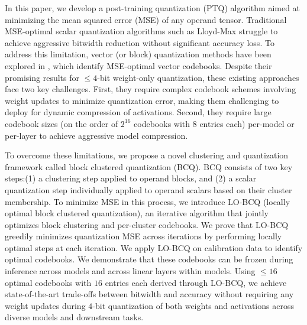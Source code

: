 In this paper, we develop a post-training quantization (PTQ) algorithm aimed at minimizing the mean squared error (MSE) of any operand tensor. Traditional MSE-optimal scalar quantization algorithms such as Lloyd-Max \citep{Lloyd} struggle to achieve aggressive bitwidth reduction without significant accuracy loss. To address this limitation, vector (or block) quantization methods have been explored in \citep{tseng2024quipbetterllmquantization,egiazarian2024aqlm}, which identify MSE-optimal vector codebooks. Despite their promising results for $\le4$-bit weight-only quantization, these existing approaches face two key challenges. First, they require complex codebook schemes involving weight updates to minimize quantization error, making them challenging to deploy for dynamic compression of activations. Second, they require large codebook sizes (on the order of $2^{16}$ codebooks with $8$ entries each) per-model or per-layer to achieve aggressive model compression.



To overcome these limitations, we propose a novel clustering and quantization framework called block clustered quantization (BCQ). BCQ consists of two key steps:(1) a clustering step applied to operand blocks, and (2) a scalar quantization step individually applied to operand scalars based on their cluster membership. To minimize MSE in this process, we introduce LO-BCQ (locally optimal block clustered quantization), an iterative algorithm that jointly optimizes block clustering and per-cluster codebooks. We prove that LO-BCQ greedily minimizes quantization MSE across iterations by performing locally optimal steps at each iteration. We apply LO-BCQ on calibration data to identify optimal codebooks. We demonstrate that these codebooks can be frozen during inference across models and across linear layers within models. Using $\le16$ optimal codebooks with $16$ entries each derived through LO-BCQ, we achieve state-of-the-art trade-offs between bitwidth and accuracy without requiring any weight updates during $4$-bit quantization of both weights and activations across diverse models and downstream tasks.

